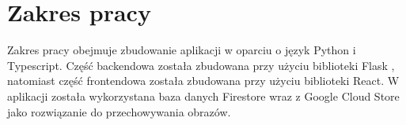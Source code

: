 \section{Zakres pracy}
Zakres pracy obejmuje zbudowanie aplikacji w oparciu o język Python \cite{python} i Typescript\cite*{TypeScript}. Część backendowa została zbudowana przy użyciu biblioteki Flask \cite{flask}, natomiast część frontendowa została zbudowana przy użyciu biblioteki React. W aplikacji została wykorzystana baza danych Firestore wraz z Google Cloud Store jako rozwiązanie do przechowywania obrazów. 
